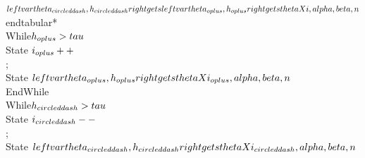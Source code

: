   $  \\left\\{ \\vartheta_{\\circleddash}, h_{\\circleddash} \\right\\} \\gets \\left\\{ \\vartheta_{\\oplus}, h_{\\oplus} \\right\\} \\gets \\thetaX{i, \\alpha, \\beta, n}$
  \\end{tabular*}
 \\While{$h_{\\oplus} > \\tau$}
 \\State  $i_{\\oplus}++$ \\;
 \\State  $\\left\\{ \\vartheta_{\\oplus}, h_{\\oplus}\\right\\} \\gets \\thetaX{i_{\\oplus}, \\alpha, \\beta, n}$
 \\EndWhile
 \\While{$h_{\\circleddash} > \\tau$}
  \\State   $i_{\\circleddash}--$ \\;
  \\State  $\\left\\{ \\vartheta_{\\circleddash}, h_{\\circleddash}\\right\\} \\gets \\thetaX{i_{\\circleddash}, \\alpha, \\beta, n}$
